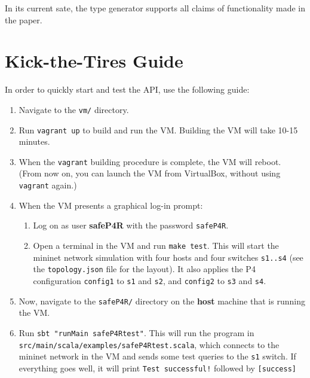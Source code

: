 \documentclass{article}
\begin{document}
In its current sate, the type generator supports all claims of functionality
made in the paper.

\section{Kick-the-Tires Guide}

In order to quickly start and test the API, use the following guide:

\begin{enumerate}
    \item Navigate to the \texttt{vm/} directory.
    \item Run \texttt{vagrant up} to build and run the VM. Building the VM will take 10-15 minutes.
    \item When the \texttt{vagrant} building procedure is complete, the VM will reboot.
       (From now on, you can launch the VM from VirtualBox, without using \texttt{vagrant} again.)
    \item When the VM presents a graphical log-in prompt:
        \begin{enumerate}
            \item Log on as user \textbf{safeP4R} with the password \texttt{safeP4R}.
            \item Open a terminal in the VM and run \texttt{make test}.
                This will start the mininet network simulation with four hosts and four switches \texttt{s1..s4}
                (see the \texttt{topology.json} file for the layout).
                It also applies the P4 configuration \texttt{config1} to \texttt{s1} and \texttt{s2},
                and \texttt{config2} to \texttt{s3} and \texttt{s4}.
        \end{enumerate}
    \item Now, navigate to the \texttt{safeP4R/} directory on the \textbf{host} machine that is running the VM.
    \item Run \texttt{sbt "runMain safeP4Rtest"}. This will run the program in\\
        \texttt{src/main/scala/examples/safeP4Rtest.scala}, which connects to the mininet network in the VM and
        sends some test queries to the \texttt{s1} switch. If everything goes well, it will print
        \texttt{Test successful!} followed by \texttt{[success]}
\end{enumerate}
\end{document}
